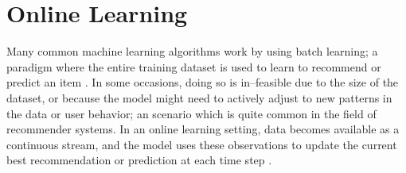 \section{Online Learning} \label{sect:theory:online-learning}

Many common machine learning algorithms work by using batch learning; a paradigm where the entire training dataset is used to learn to recommend or predict an item \cite{article:batch-learning}. In some occasions, doing so is in--feasible due to the size of the dataset, or because the model might need to actively adjust to new patterns in the data or user behavior; an scenario which is quite common in the field of recommender systems. In an online learning setting, data becomes available as a continuous stream, and the model uses these observations to update the current best recommendation or prediction at each time step \cite{article:online-learning}.
